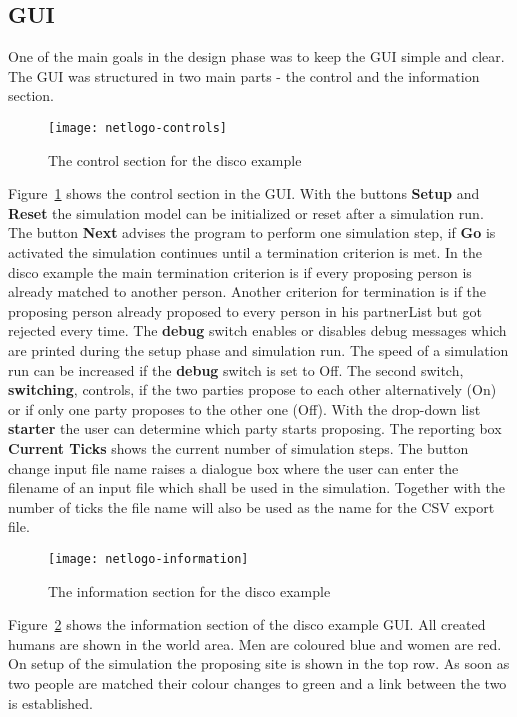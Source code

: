 \subsection{GUI}
One of the main goals in the design phase was to keep the GUI simple and clear.
The GUI was structured in two main parts - the control and the information section.
\begin{figure}[H]	
  \centering
  \texttt{[image: netlogo-controls]}
	\caption{The control section for the disco example}
	\label{fig:control-disco-gui}
\end{figure}
Figure~\ref{fig:control-disco-gui} shows the control section in the GUI. 
With the buttons \textbf{Setup} and \textbf{Reset} the simulation model can be initialized or reset after a simulation run.
The button \textbf{Next} advises the program to perform one simulation step, if \textbf{Go} is activated the simulation continues until a termination criterion is met.
In the disco example the main termination criterion is if every proposing person is already matched to another person. 
Another criterion for termination is if the proposing person already proposed to every person in his partnerList but got rejected every time.
The \textbf{debug} switch enables or disables debug messages which are printed during the setup phase and simulation run.
The speed of a simulation run can be increased if the \textbf{debug} switch is set to Off.
The second switch, \textbf{switching}, controls, if the two parties propose to each other alternatively (On) or if only one party proposes to the other one (Off).
With the drop-down list \textbf{starter} the user can determine which party starts proposing.
The reporting box \textbf{Current Ticks} shows the current number of simulation steps.
The button change input file name raises a dialogue box where the user can enter the filename of an input file which shall be used in the simulation.
Together with the number of ticks the file name will also be used as the name for the CSV export file.
\begin{figure}[H]
  \centering
  \texttt{[image: netlogo-information]}
	\caption{The information section for the disco example}
	\label{fig:info-disco-gui}
\end{figure}
Figure~\ref{fig:info-disco-gui} shows the information section of the disco example GUI. 
All created humans are shown in the world area. 
Men are coloured blue and women are red.
On setup of the simulation the proposing site is shown in the top row. 
As soon as two people are matched their colour changes to green and a link between the two is established.
